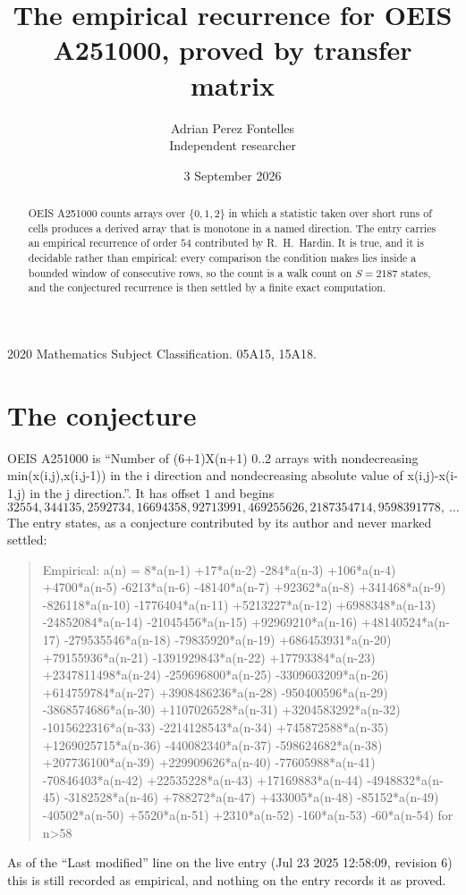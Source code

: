\documentclass[11pt,a4paper]{article}
\title{The empirical recurrence for OEIS A251000, proved by transfer matrix}
\author{Adrian Perez Fontelles\\ \small Independent researcher}
\date{3 September 2026}
\theoremstyle{plain}
\theoremstyle{definition}
\begin{document}
\maketitle

\begin{abstract}
OEIS A251000 counts arrays over $\{0,1,2\}$ in which a statistic taken over short runs
of cells produces a derived array that is monotone in a named direction. The entry carries an
empirical recurrence of order $54$ contributed by R.~H.~Hardin. It is true, and it is
decidable rather than empirical: every comparison the condition makes lies inside a bounded
window of consecutive rows, so the count is a walk count on $S=2187$ states, and the
conjectured recurrence is then settled by a finite exact computation.
\end{abstract}

\noindent\small 2020 Mathematics Subject Classification. 05A15, 15A18.\normalsize

\section{The conjecture}

OEIS A251000 is ``Number of (6+1)X(n+1) 0..2 arrays with nondecreasing min(x(i,j),x(i,j-1)) in the i direction and nondecreasing absolute value of x(i,j)-x(i-1,j) in the j direction.''. It has offset $1$ and begins
\[
32554, 344135, 2592734, 16694358, 92713991, 469255626, 2187354714, 9598391778,\ \dots
\]
The entry states, as a conjecture contributed by its author and never marked settled:
\begin{quote}
Empirical: a(n) = 8*a(n-1) +17*a(n-2) -284*a(n-3) +106*a(n-4) +4700*a(n-5) -6213*a(n-6) -48140*a(n-7) +92362*a(n-8) +341468*a(n-9) -826118*a(n-10) -1776404*a(n-11) +5213227*a(n-12) +6988348*a(n-13) -24852084*a(n-14) -21045456*a(n-15) +92969210*a(n-16) +48140524*a(n-17) -279535546*a(n-18) -79835920*a(n-19) +686453931*a(n-20) +79155936*a(n-21) -1391929843*a(n-22) +17793384*a(n-23) +2347811498*a(n-24) -259696800*a(n-25) -3309603209*a(n-26) +614759784*a(n-27) +3908486236*a(n-28) -950400596*a(n-29) -3868574686*a(n-30) +1107026528*a(n-31) +3204583292*a(n-32) -1015622316*a(n-33) -2214128543*a(n-34) +745872588*a(n-35) +1269025715*a(n-36) -440082340*a(n-37) -598624682*a(n-38) +207736100*a(n-39) +229909626*a(n-40) -77605988*a(n-41) -70846403*a(n-42) +22535228*a(n-43) +17169883*a(n-44) -4948832*a(n-45) -3182528*a(n-46) +788272*a(n-47) +433005*a(n-48) -85152*a(n-49) -40502*a(n-50) +5520*a(n-51) +2310*a(n-52) -160*a(n-53) -60*a(n-54) for n>58
\end{quote}
As of the ``Last modified'' line on the live entry (Jul 23 2025 12:58:09, revision 6) this is still
recorded as empirical, and nothing on the entry records it as proved.
\end{document}
